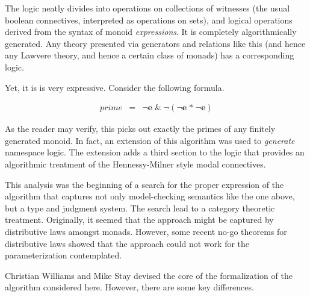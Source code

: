 The logic neatly divides into operations on collections of witnesses
(the usual boolean connectives, interpreted as operations on sets),
and logical operations derived from the syntax of monoid
\emph{expressions}. It is completely algorithmically generated. Any
theory presented via generators and relations like this (and hence any
Lawvere theory, and hence a certain class of monads) has a
corresponding logic.

Yet, it is is very expressive. Consider the following formula.

\begin{eqnarray*}
  prime & = & \neg \mathbf{e} \; \& \; \neg (\neg \mathbf{e} \; \mathbf{*}\; \neg \mathbf{e})
\end{eqnarray*}

As the reader may verify, this picks out exactly the primes of any
finitely generated monoid. In fact, an extension of this algorithm was
used to \emph{generate} namespace logic. The extension adds a third
section to the logic that provides an algorithmic treatment of the
Hennessy-Milner style modal connectives.

This analysis was the beginning of a search for the proper expression
of the algorithm that captures not only model-checking semantics like
the one above, but a type and judgment system. The search lead to a
category theoretic treatment. Originally, it seemed that the approach
might be captured by distributive laws amongst monads. However, some
recent no-go theorems for distributive laws showed that the approach
could not work for the parameterization contemplated.

Christian Williams and Mike Stay devised the core of the formalization
of the algorithm considered here. However, there are some key
differences.


